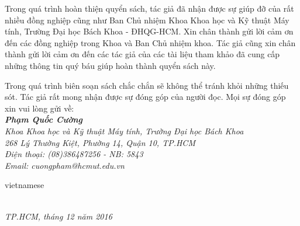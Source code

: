 Trong quá trình hoàn thiện quyển sách, tác giả đã nhận được sự giúp đỡ của rất nhiều đồng nghiệp cũng như Ban Chủ nhiệm Khoa Khoa học và Kỹ thuật Máy tính, Trường Đại học Bách Khoa - ĐHQG-HCM. Xin chân thành gửi lời cảm ơn đến các đồng nghiệp trong Khoa và Ban Chủ nhiệm khoa. Tác giả cũng xin chân thành gửi lời cảm ơn đến các tác giả của các tài liệu tham khảo đã cung cấp những thông tin quý báu giúp hoàn thành quyển sách này.

Trong quá trình biên soạn sách chắc chắn sẽ không thể tránh khỏi những thiếu sót. Tác giả rất mong nhận được sự đóng góp của người đọc. Mọi sự đóng góp xin vui lòng gửi về:\\
\emph{\bfseries Phạm Quốc Cường}\\
\emph{Khoa Khoa học và Kỹ thuật Máy tính, Trường Đại học Bách Khoa}\\
\emph{268 Lý Thường Kiệt, Phường 14, Quận 10, TP.HCM}\\
\emph{Điện thoại: (08)386487256 - NB: 5843}\\
\emph{Email: cuongpham@hcmut.edu.vn} 

\begin{otherlanguage*}{vietnamese}
\begin{flushright}
{\makeatletter\itshape
    \@firstname\ \@lastname \\
    TP.HCM, tháng 12 năm 2016
\makeatother}
\end{flushright}
\end{otherlanguage*}

